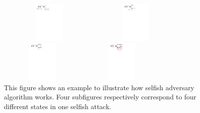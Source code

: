 \documentclass{llncs}
\begin{document}
\begin{figure}[!htbp]
\begin{minipage}[t]{0.5\linewidth}
\centering
\includegraphics[height=0.8in, width=1.95in]{Figures/Selfish-Attack-1.pdf}

\end{minipage}%
\begin{minipage}[t]{0.5\linewidth}
\centering
\includegraphics[height=0.8in, width=1.65in]{Figures/Selfish-Attack-2.pdf}

\end{minipage}

\begin{minipage}[t]{0.5\linewidth}
\centering
\includegraphics[height=0.8in, width=1.65in]{Figures/Selfish-Attack-3.pdf}

\end{minipage}%
\begin{minipage}[t]{0.5\linewidth}
\centering
\includegraphics[height=0.8in, width=1.65in]{Figures/Selfish-Attack-4.pdf}

\end{minipage}
\vspace{0mm}
\setlength{\belowcaptionskip}{-10pt}
\caption{This figure shows an example to illustrate how selfish adversary algorithm works. Four subfigures respectively correspond to four different states in one selfish attack.}
\label{selfish}
\vspace{-3mm}
\end{figure}
\end{document}
